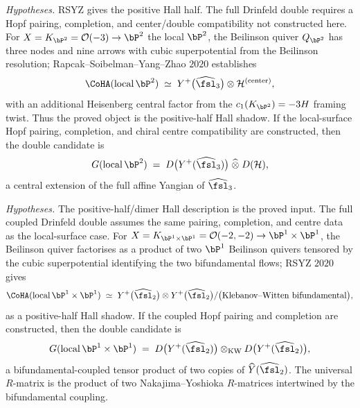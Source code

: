 \begin{theorem}
\label{thm:GofLocalP2}
\noindent\emph{Hypotheses.} RSYZ gives the positive Hall half. The full Drinfeld double requires a Hopf pairing, completion, and center/double compatibility not constructed here.
For $X = K_{\bP^2} = \mathcal{O}(-3) \to \bP^2$ the local $\bP^2$, the
Beilinson quiver $Q_{\bP^2}$ has three nodes and nine arrows with cubic
superpotential from the Beilinson resolution; Rapcak--Soibelman--Yang--Zhao
$2020$ establishes
\[
 \CoHA(\mathrm{local}\,\bP^2) \;\simeq\; Y^+\bigl(\widehat{\fsl}_3\bigr)
 \otimes \mathcal{H}^{(\mathrm{center})},
\]
with an additional Heisenberg central factor from the $c_1(K_{\bP^2}) = -3H$
framing twist.  Thus the proved object is the positive-half Hall shadow.
If the local-surface Hopf pairing, completion, and chiral centre
compatibility are constructed, then the double candidate is
\[
 G(\mathrm{local}\,\bP^2) \;=\;
 D\bigl(Y^+(\widehat{\fsl}_3)\bigr)\;\widehat{\otimes}\;D(\mathcal{H}),
\]
a central extension of the full affine Yangian of $\widehat{\fsl}_3$.
\end{theorem}

\begin{theorem}
\label{thm:GofLocalP1P1}
\noindent\emph{Hypotheses.} The positive-half/dimer Hall description is the proved input. The full coupled Drinfeld double assumes the same pairing, completion, and centre data as the local-surface case.
For $X = K_{\bP^1 \times \bP^1} = \mathcal{O}(-2,-2) \to \bP^1 \times \bP^1$, the
Beilinson quiver factorises as a product of two $\bP^1$ Beilinson quivers
tensored by the cubic superpotential identifying the two bifundamental
flows; RSYZ $2020$ gives
\[
 \CoHA(\mathrm{local}\,\bP^1 \times \bP^1) \;\simeq\;
 Y^+\bigl(\widehat{\fsl}_2\bigr) \otimes Y^+\bigl(\widehat{\fsl}_2\bigr)
 / \bigl(\text{Klebanov--Witten bifundamental}\bigr),
\]
as a positive-half Hall shadow.  If the coupled Hopf pairing and
completion are constructed, then the double candidate is
\[
 G(\mathrm{local}\,\bP^1 \times \bP^1) \;=\;
 D\bigl(Y^+(\widehat{\fsl}_2)\bigr) \otimes_{\mathrm{KW}}
 D\bigl(Y^+(\widehat{\fsl}_2)\bigr),
\]
a bifundamental-coupled tensor product of two copies of
$\widehat{Y}(\widehat{\fsl}_2)$. The universal $R$-matrix is the product
of two Nakajima--Yoshioka $R$-matrices intertwined by the bifundamental
coupling.
\end{theorem}

